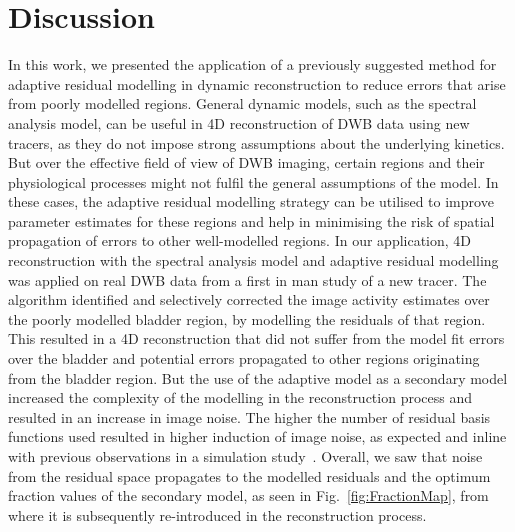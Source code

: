 \section{Discussion}
In this work, we presented the application of a previously suggested method for adaptive residual modelling in dynamic reconstruction to reduce errors that arise from poorly modelled regions. General dynamic models, such as the spectral analysis model, can be useful in 4D reconstruction of DWB data using new tracers, as they do not impose strong assumptions about the underlying kinetics. But over the effective field of view of DWB imaging, certain regions and their physiological processes might not fulfil the general assumptions of the model. In these cases, the adaptive residual modelling strategy can be utilised to improve parameter estimates for these regions and help in minimising the risk of spatial propagation of errors to other well-modelled regions.
In our application, 4D reconstruction with the spectral analysis model and adaptive residual modelling was applied on real DWB data from a first in man study of a new tracer. The algorithm identified and selectively corrected the image activity estimates over the poorly modelled bladder region, by modelling the residuals of that region. This resulted in a 4D reconstruction that did not suffer from the model fit errors over the bladder and potential errors propagated to other regions originating from the bladder region. 
But the use of the adaptive model as a secondary model increased the complexity of the modelling in the reconstruction process and resulted in an increase in image noise. The higher the number of residual basis functions used resulted in higher induction of image noise, as expected and inline with previous observations in a simulation study~\cite{Kotasidis2014c}.
Overall, we saw that noise from the residual space propagates to the modelled residuals and the optimum fraction values of the secondary model, as seen in Fig.~\ref{fig:FractionMap}, from where it is subsequently re-introduced in the reconstruction process. 

